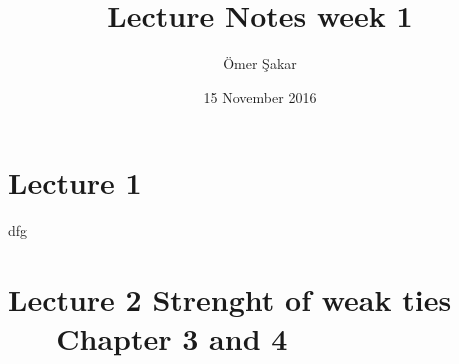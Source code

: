 \documentclass[12pt]{scrartcl}
\title{Lecture Notes week 1}
\author{\"Omer \c Sakar}
\date{15 November 2016}
\begin{document}
\maketitle
\tableofcontents
\newpage

\section{Lecture 1}
dfg

\newpage
\section{Lecture 2 Strenght of weak ties \\ \ \ \ Chapter 3 and 4} 
\end{document}
